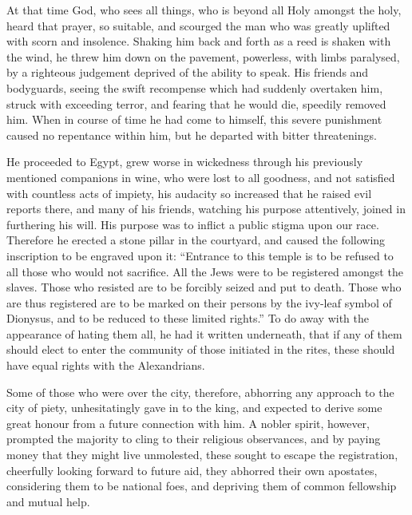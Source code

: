  At that time God, who sees all things, who is beyond all
Holy amongst the holy, heard that prayer, so suitable, and scourged the
man who was greatly uplifted with scorn and insolence. 
Shaking him back and forth as a reed is shaken with the wind, he threw
him down on the pavement, powerless, with limbs paralysed, by a
righteous judgement deprived of the ability to speak.  His
friends and bodyguards, seeing the swift recompense which had suddenly
overtaken him, struck with exceeding terror, and fearing that he would
die, speedily removed him.  When in course of time he had
come to himself, this severe punishment caused no repentance within him,
but he departed with bitter threatenings.

 He proceeded to Egypt, grew worse in wickedness through
his previously mentioned companions in wine, who were lost to all
goodness,  and not satisfied with countless acts of
impiety, his audacity so increased that he raised evil reports there,
and many of his friends, watching his purpose attentively, joined in
furthering his will.  His purpose was to inflict a public
stigma upon our race. Therefore he erected a stone pillar in the
courtyard, and caused the following inscription to be engraved upon it:
 ``Entrance to this temple is to be refused to all those
who would not sacrifice. All the Jews were to be registered amongst the
slaves. Those who resisted are to be forcibly seized and put to death.
 Those who are thus registered are to be marked on their
persons by the ivy-leaf symbol of Dionysus, and to be reduced to these
limited rights.''  To do away with the appearance of hating
them all, he had it written underneath, that if any of them should elect
to enter the community of those initiated in the rites, these should
have equal rights with the Alexandrians.

 Some of those who were over the city, therefore, abhorring
any approach to the city of piety, unhesitatingly gave in to the king,
and expected to derive some great honour from a future connection with
him.  A nobler spirit, however, prompted the majority to
cling to their religious observances, and by paying money that they
might live unmolested, these sought to escape the registration,
 cheerfully looking forward to future aid, they abhorred
their own apostates, considering them to be national foes, and depriving
them of common fellowship and mutual help.

